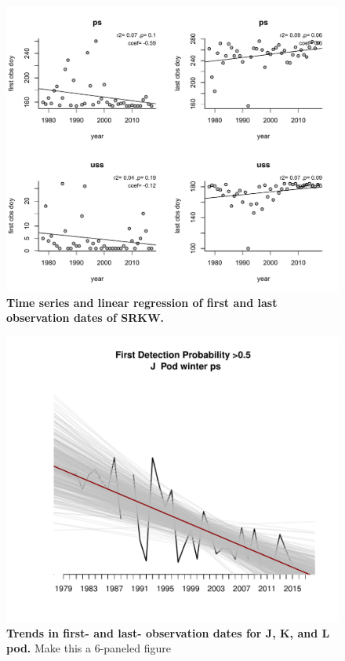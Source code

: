 \documentclass{article}
\begin{document}
  \begin{figure}[p]
\includegraphics{../analyses/orcaphen/figures/linreg_1978_2017.pdf} 
\caption{\textbf{Time series and linear regression of first and last observation dates of SRKW.} }
 \label{fig:reg}
 \end{figure}
 

 
\begin{figure}[p]
\includegraphics{../analyses/figures/J/orcaphen_1976_2017_PS_winter_Jfirst.pdf} 
\caption{\textbf{Trends in first- and last- observation dates for J, K, and L pod.} Make this a 6-paneled figure}
 \label{fig:trends}
 \end{figure}


\end{document}
